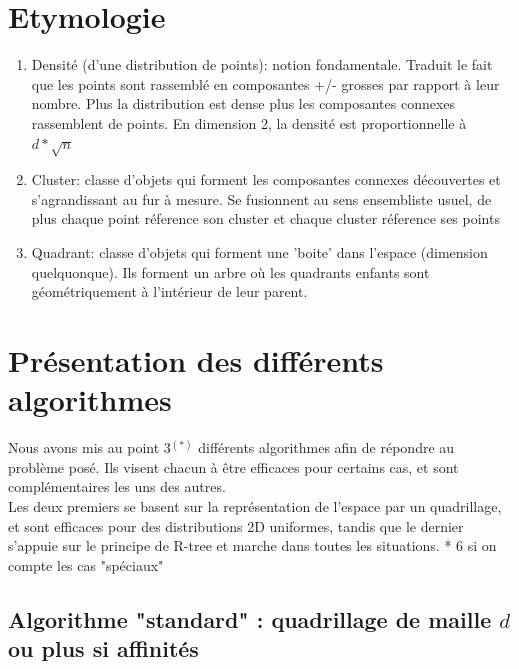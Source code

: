 \documentclass[a4paper,11pt]{article}
\begin{document}
\section{Etymologie}
\begin{enumerate}
    \item {Densité (d'une distribution de points): notion fondamentale. Traduit le fait que les points sont rassemblé en composantes +/- grosses par rapport à leur nombre. Plus la distribution est dense plus les composantes connexes rassemblent de points. En dimension 2, la densité est proportionnelle à $d * \sqrt{n}$}
    \item{Cluster: classe d'objets qui forment les composantes connexes découvertes et s'agrandissant au fur à mesure. Se fusionnent au sens ensembliste usuel, de plus chaque point réference son cluster et chaque cluster réference ses points}
    \item {Quadrant: classe d'objets qui forment une 'boite' dans l'espace (dimension quelquonque). Ils forment un arbre où les quadrants enfants sont géométriquement à l'intérieur de leur parent.}
\end{enumerate}














\section{Présentation des différents algorithmes}

Nous avons mis au point 3$^{(*)}$ différents algorithmes afin de répondre au problème posé. Ils visent chacun à être efficaces pour certains cas, et sont complémentaires les uns des autres.\\


Les deux premiers se basent sur la représentation de l'espace par un quadrillage, et sont efficaces pour des distributions 2D uniformes,  tandis que le dernier s'appuie sur le principe de R-tree et marche dans toutes les situations.
    \bigbreak
    \bigbreak
    * 6 si on compte les cas "spéciaux"
    \bigbreak

\subsection{Algorithme "standard" : quadrillage de maille $d$ ou plus si affinités}
\end{document}
